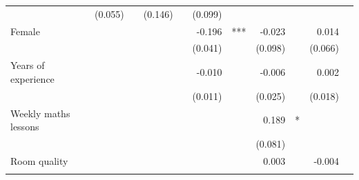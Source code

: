 \documentclass{article}
\begin{document}
\begin{table}[!h]
\begin{tabular}{lllllllllll}
  \multicolumn{1}{l}{} &
  \multicolumn{1}{r}{(0.055)} &
  \multicolumn{1}{l}{} &
  \multicolumn{1}{r}{(0.146)} &
  \multicolumn{1}{l}{} &
  \multicolumn{1}{r}{(0.099)} &
  \multicolumn{1}{l}{} \\
\multicolumn{1}{l}{Female} &
  \multicolumn{1}{r}{} &
  \multicolumn{1}{l}{} &
  \multicolumn{1}{r}{} &
  \multicolumn{1}{l}{} &
  \multicolumn{1}{r}{-0.196} &
  \multicolumn{1}{l}{***} &
  \multicolumn{1}{r}{-0.023} &
  \multicolumn{1}{l}{} &
  \multicolumn{1}{r}{0.014} &
  \multicolumn{1}{l}{} \\
\multicolumn{1}{l}{} &
  \multicolumn{1}{r}{} &
  \multicolumn{1}{l}{} &
  \multicolumn{1}{r}{} &
  \multicolumn{1}{l}{} &
  \multicolumn{1}{r}{(0.041)} &
  \multicolumn{1}{l}{} &
  \multicolumn{1}{r}{(0.098)} &
  \multicolumn{1}{l}{} &
  \multicolumn{1}{r}{(0.066)} &
  \multicolumn{1}{l}{} \\
\multicolumn{1}{l}{Years of experience} &
  \multicolumn{1}{r}{} &
  \multicolumn{1}{l}{} &
  \multicolumn{1}{r}{} &
  \multicolumn{1}{l}{} &
  \multicolumn{1}{r}{-0.010} &
  \multicolumn{1}{l}{} &
  \multicolumn{1}{r}{-0.006} &
  \multicolumn{1}{l}{} &
  \multicolumn{1}{r}{0.002} &
  \multicolumn{1}{l}{} \\
\multicolumn{1}{l}{} &
  \multicolumn{1}{r}{} &
  \multicolumn{1}{l}{} &
  \multicolumn{1}{r}{} &
  \multicolumn{1}{l}{} &
  \multicolumn{1}{r}{(0.011)} &
  \multicolumn{1}{l}{} &
  \multicolumn{1}{r}{(0.025)} &
  \multicolumn{1}{l}{} &
  \multicolumn{1}{r}{(0.018)} &
  \multicolumn{1}{l}{} \\
\multicolumn{1}{l}{Weekly maths lessons} &
  \multicolumn{1}{r}{} &
  \multicolumn{1}{l}{} &
  \multicolumn{1}{r}{} &
  \multicolumn{1}{l}{} &
  \multicolumn{1}{r}{} &
  \multicolumn{1}{l}{} &
  \multicolumn{1}{r}{0.189} &
  \multicolumn{1}{l}{*} &
  \multicolumn{1}{r}{} &
  \multicolumn{1}{l}{} \\
\multicolumn{1}{l}{} &
  \multicolumn{1}{r}{} &
  \multicolumn{1}{l}{} &
  \multicolumn{1}{r}{} &
  \multicolumn{1}{l}{} &
  \multicolumn{1}{r}{} &
  \multicolumn{1}{l}{} &
  \multicolumn{1}{r}{(0.081)} &
  \multicolumn{1}{l}{} &
  \multicolumn{1}{r}{} &
  \multicolumn{1}{l}{} \\
\multicolumn{1}{l}{Room quality} &
  \multicolumn{1}{r}{} &
  \multicolumn{1}{l}{} &
  \multicolumn{1}{r}{} &
  \multicolumn{1}{l}{} &
  \multicolumn{1}{r}{} &
  \multicolumn{1}{l}{} &
  \multicolumn{1}{r}{0.003} &
  \multicolumn{1}{l}{} &
  \multicolumn{1}{r}{-0.004} &
  \multicolumn{1}{l}{} \\
\multicolumn{1}{l}{} &

\end{tabular}
\end{table}
\end{document}
